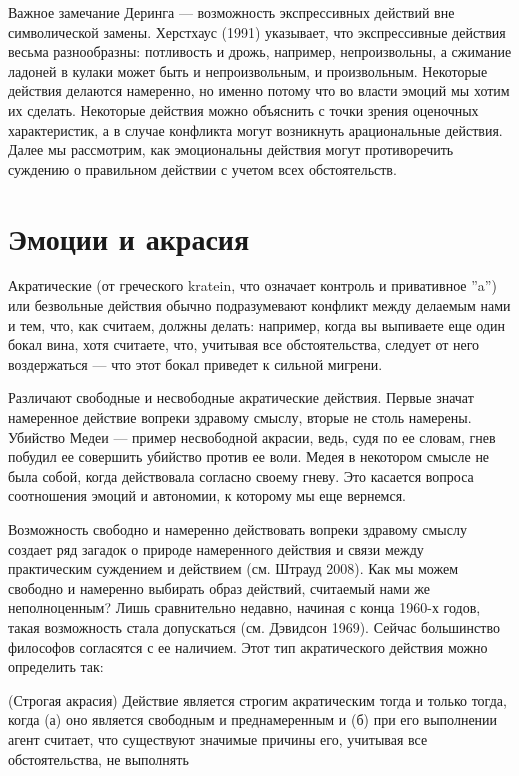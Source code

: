 \documentclass[11pt]{book}
\begin{document}
Важное замечание Деринга --- возможность экспрессивных действий вне символической замены. Херстхаус (1991) указывает, что экспрессивные действия весьма разнообразны: потливость и дрожь, например, непроизвольны, а сжимание ладоней в кулаки может быть и непроизвольным, и произвольным. Некоторые действия делаются намеренно, но именно потому что во власти эмоций мы хотим их сделать. Некоторые действия можно объяснить с точки зрения оценочных характеристик, а в случае конфликта могут возникнуть арациональные действия. Далее мы рассмотрим, как эмоциональны действия могут противоречить суждению о правильном действии с учетом всех обстоятельств.

\section{Эмоции и акрасия}

Акратические (от греческого kratein, что означает контроль и привативное ''a'') или безвольные действия обычно подразумевают конфликт между делаемым нами и тем, что, как считаем, должны делать: например, когда вы выпиваете еще один бокал вина, хотя считаете, что, учитывая все обстоятельства, следует от него воздержаться --- что этот бокал приведет к сильной мигрени.

Различают свободные и несвободные акратические действия. Первые значат намеренное действие вопреки здравому смыслу, вторые не столь намерены. Убийство Медеи --- пример несвободной акрасии, ведь, судя по ее словам, гнев побудил ее совершить убийство против ее воли. Медея в некотором смысле не была собой, когда действовала согласно своему гневу. Это касается вопроса соотношения эмоций и автономии, к которому мы еще вернемся.

Возможность свободно и намеренно действовать вопреки здравому смыслу создает ряд загадок о природе намеренного действия и связи между практическим суждением и действием (см. Штрауд 2008). Как мы можем свободно и намеренно выбирать образ действий, считаемый нами же неполноценным? Лишь сравнительно недавно, начиная с конца 1960-х годов, такая возможность стала допускаться (см. Дэвидсон 1969). Сейчас большинство философов согласятся с ее наличием. Этот тип акратического действия можно определить так:

\smallskip

(Строгая акрасия) Действие является строгим акратическим тогда и только тогда, когда (а) оно является свободным и преднамеренным и (б) при его выполнении агент считает, что существуют значимые причины его, учитывая все обстоятельства, не выполнять
\end{document}
